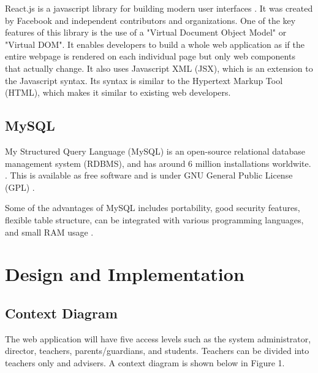 \documentclass[11pt,a4paper,titlepage]{article}
\let\stdsection\section
\renewcommand\section{\newpage\stdsection}
\begin{document}
React.js is a javascript library for building modern user interfaces \cite{Nahar}. It was created by Facebook and independent contributors and organizations. One of the key features of this library is the use of a "Virtual Document Object Model" or "Virtual DOM". It enables developers to build a whole web application as if the entire webpage is rendered on each individual page but only web components that actually change. It also uses Javascript XML (JSX), which is an extension to the Javascript syntax. Its syntax is similar to the Hypertext Markup Tool (HTML), which makes it similar to existing web developers.

\subsection{MySQL}

My Structured Query Language (MySQL) is an open-source relational database management system (RDBMS), and has around 6 million installations worldwite. \cite{DBEngines}. This is available as free software and is under GNU General Public License (GPL) \cite{mySQL}.

Some of the advantages of MySQL includes portability, good security features, flexible table structure, can be integrated with various programming languages, and small RAM usage \cite{mySQL}.  

\section{Design and Implementation}

\subsection{Context Diagram}

The web application will have five access levels such as the system administrator, director, teachers, parents/guardians, and students. Teachers can be divided into teachers only and advisers. A context diagram is shown below in Figure 1.
\end{document}
